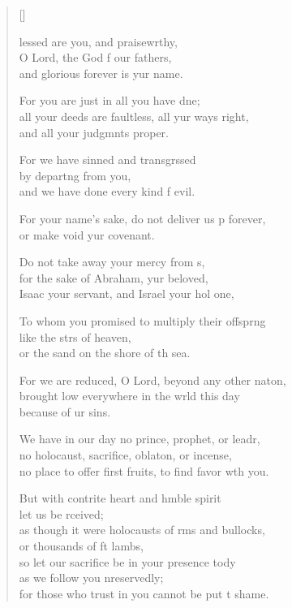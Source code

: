 \settowidth{\versewidth}{no place to offer first fruits, to find favor with you.}
\begin{verse}[\versewidth]
  \begin{patverse}
lessed are you, and praisewrthy,\Flex\\
O Lord, the God f our fathers,\Med\\
and glorious forever is yur name.

For you are just in all you have dne;\Flex\\
all your deeds are faultless, all yur ways right,\Med\\
and all your judgmnts proper.

For we have sinned and transgrssed\Flex\\
by depart\pointup{\i}ng from you,\Med\\
and we have done every kind f evil.

For your name’s sake, do not deliver us p forever,\Med\\
or make void yur covenant.

Do not take away your mercy from s,\Flex\\
for the sake of Abraham, yur beloved,\Med\\
Isaac your servant, and Israel your hol one,

To whom you promised to multiply their offspr\pointup{\i}ng\Flex\\
like the strs of heaven,\Med\\
or the sand on the shore of th sea.

For we are reduced, O Lord, beyond any other nat\pointup{\i}on,\Flex\\
brought low everywhere in the wrld this day\Med\\
because of ur sins.

We have in our day no prince, prophet, or leadr,\Flex\\
no holocaust, sacrifice, oblat\pointup{\i}on, or incense,\Med\\
no place to offer first fruits, to find favor w\pointup{\i}th you.

But with contrite heart and hmble spirit\Med\\
let us be rceived;\\
as though it were holocausts of rms and bullocks,\Med\\
or thousands of ft lambs,\\
so let our sacrifice be in your presence tody\Flex\\
as we follow you nreservedly;\Med\\
for those who trust in you cannot be put t shame.


\end{patverse}
\end{verse}

